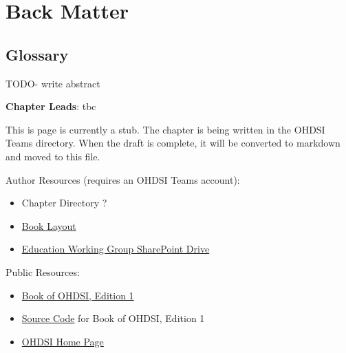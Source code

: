 \documentclass[
  letterpaper,
  paper=7in:10in,
  pagesize=pdftex,
  headinclude=on,
  footinclude=on,
  12pt]{scrbook}
\providecommand{\tightlist}{%
  \setlength{\itemsep}{0pt}\setlength{\parskip}{0pt}}\usepackage{longtable,booktabs,array}
\begin{document}
\part{Back Matter}

\chapter*{Glossary}\label{sec-appendix-glossary}


TODO- write abstract

\hfill\break

\textbf{Chapter Leads}: tbc

\begin{tcolorbox}[enhanced jigsaw, opacitybacktitle=0.6, coltitle=black, colback=white, bottomrule=.15mm, bottomtitle=1mm, title=\textcolor{quarto-callout-note-color}{\faInfo}\hspace{0.5em}{Note}, titlerule=0mm, rightrule=.15mm, colbacktitle=quarto-callout-note-color!10!white, colframe=quarto-callout-note-color-frame, toptitle=1mm, arc=.35mm, left=2mm, breakable, opacityback=0, leftrule=.75mm, toprule=.15mm]

This is page is currently a stub. The chapter is being written in the
OHDSI Teams directory. When the draft is complete, it will be converted
to markdown and moved to this file.

Author Resources (requires an OHDSI Teams account):

\begin{itemize}
\tightlist
\item
  Chapter Directory ?
\item
  \href{https://ohdsiorg.sharepoint.com/:x:/r/sites/Workgroup-EducationWorkingGroup/_layouts/15/Doc2.aspx?action=edit&sourcedoc=\%7B1fa31e39-1c5f-4918-b878-609ebd9810b3\%7D&wdOrigin=TEAMS-WEB.teamsSdk_ns.rwc&wdExp=TEAMS-TREATMENT&wdhostclicktime=1748104477731&web=1}{Book
  Layout}
\item
  \href{https://ohdsiorg.sharepoint.com/sites/Workgroup-EducationWorkingGroup/Shared\%20Documents/Forms/AllItems.aspx?viewid=05fec2cc\%2Dec8a\%2D4d04\%2Db565\%2Dcf1289b96f67}{Education
  Working Group SharePoint Drive}
\end{itemize}

Public Resources:

\begin{itemize}
\tightlist
\item
  \href{https://ohdsi.github.io/TheBookOfOhdsi/}{Book of OHDSI, Edition
  1}
\item
  \href{https://github.com/OHDSI/TheBookOfOhdsi}{Source Code} for Book
  of OHDSI, Edition 1
\item
  \href{https://ohdsi.org/}{OHDSI Home Page}
\end{itemize}

\end{tcolorbox}
\end{document}
